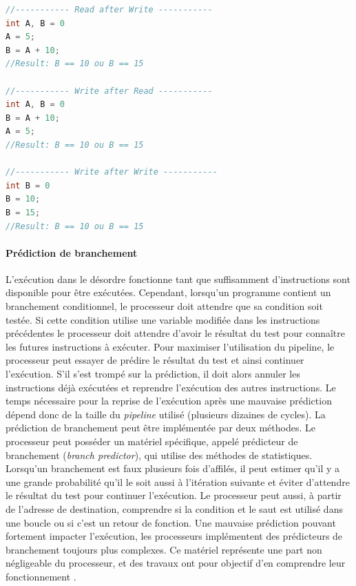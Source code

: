 \begin{lstlisting}[language=C, caption=Exemples de dépendances entre deux instructions., float,floatplacement=H, label=code_dependances]
//----------- Read after Write -----------
int A, B = 0
A = 5;
B = A + 10;
//Result: B == 10 ou B == 15

//----------- Write after Read -----------
int A, B = 0
B = A + 10;
A = 5;
//Result: B == 10 ou B == 15 
 
//----------- Write after Write -----------
int B = 0
B = 10;
B = 15;
//Result: B == 10 ou B == 15
\end{lstlisting}






\paragraph{Prédiction de branchement}\label{sec:branch_predictor}
L'exécution dans le désordre fonctionne tant que suffisamment d'instructions sont disponible pour être exécutées. Cependant, lorsqu'un programme contient un branchement conditionnel, le processeur doit attendre que sa condition soit testée. Si cette condition utilise une variable modifiée dans les instructions précédentes le processeur doit attendre d'avoir le résultat du test pour connaître les futures instructions à exécuter. Pour maximiser l'utilisation du pipeline, le processeur peut essayer de prédire le résultat du test et ainsi continuer l'exécution. S'il s'est trompé sur la prédiction, il doit alors annuler les instructions déjà exécutées et reprendre l'exécution des autres instructions. Le temps nécessaire pour la reprise de l'exécution après une mauvaise prédiction dépend donc de la taille du \textit{pipeline} utilisé (plusieurs dizaines de cycles).
La prédiction de branchement peut être implémentée par deux méthodes.
Le processeur peut posséder un matériel spécifique, appelé prédicteur de branchement (\textit{branch predictor}), qui utilise des méthodes de statistiques. Lorsqu’un branchement est faux plusieurs fois d’affilés, il peut estimer qu'il y a une grande probabilité qu'il le soit aussi à l’itération suivante et éviter d’attendre le résultat du test pour continuer l’exécution. Le processeur peut aussi, à partir de l'adresse de destination, comprendre si la condition et le saut est utilisé dans une boucle ou si c'est un retour de fonction. Une mauvaise prédiction pouvant fortement impacter l'exécution, les processeurs implémentent des prédicteurs de branchement toujours plus complexes. Ce matériel représente une part non négligeable du processeur, et des travaux ont pour objectif d'en comprendre leur fonctionnement \cite{Milenkovic2002}.
